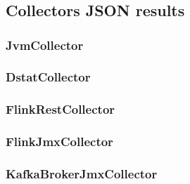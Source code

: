 \appendix

\chapter{}

\section{Collectors JSON results}
\subsection{JvmCollector}
\subsection{DstatCollector}
\label{subsec:dstat-result}
\subsection{FlinkRestCollector}
\subsection{FlinkJmxCollector}
\subsection{KafkaBrokerJmxCollector}

